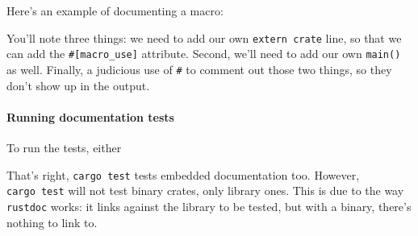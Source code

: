 \documentclass[a4paper,]{book}
\newenvironment{Shaded}{\begin{snugshade}}{\end{snugshade}}
\newcommand{\KeywordTok}[1]{\textcolor[rgb]{0.13,0.29,0.53}{\textbf{{#1}}}}
\newcommand{\CommentTok}[1]{\textcolor[rgb]{0.56,0.35,0.01}{\textit{{#1}}}}
\newcommand{\PreprocessorTok}[1]{\textcolor[rgb]{0.56,0.35,0.01}{\textit{{#1}}}}
\newcommand{\AttributeTok}[1]{\textcolor[rgb]{0.77,0.63,0.00}{{#1}}}
\newcommand{\NormalTok}[1]{{#1}}
\let\oldparagraph\paragraph
\renewcommand{\paragraph}[1]{\oldparagraph{#1}\mbox{}}
\begin{document}
Here's an example of documenting a macro:

\begin{Shaded}
\end{Shaded}

You'll note three things: we need to add our own \texttt{extern\ crate}
line, so that we can add the \texttt{\#{[}macro\_use{]}} attribute.
Second, we'll need to add our own \texttt{main()} as well. Finally, a
judicious use of \texttt{\#} to comment out those two things, so they
don't show up in the output.

\paragraph{Running documentation
tests}\label{running-documentation-tests}

To run the tests, either

\begin{Shaded}
\end{Shaded}

That's right, \texttt{cargo\ test} tests embedded documentation too.
However, \texttt{cargo\ test} will not test binary crates, only library
ones. This is due to the way \texttt{rustdoc} works: it links against
the library to be tested, but with a binary, there's nothing to link to.
\end{document}
